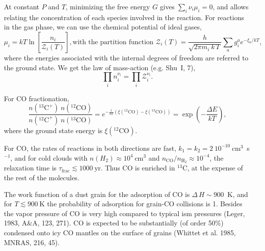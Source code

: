 At constant $P$ and $T$, minimizing the free energy $G$ gives $
\sum_i \nu_i \mu_i = 0$, and allows relating the concentration of each
species involved in the reaction. For reactions in the gas phase, we
can use the chemical potential of ideal gases,
\[ \mu_i = k T \ln \left[ \frac{n_i} {\mathcal{Z}_i(T)} \right], 
\text{with the partition function } \mathcal{Z}_i(T) = \frac{h}{\sqrt{2 \pi m_i
~k\,T}} \sum_a g^a_i e^{-\xi_a/kT}, \] where the energies associated
with the internal degrees of freedom are referred to the ground
state. We get the law of mass-action (e.g. Shu~I, 7), \[
\prod_i n_i^{\nu_i} = \prod_i \mathcal{Z}_i^{\nu_i}   .\]


\foilhead{} 

For CO fractionation,
\[  \frac{n(^{13}\mathrm{C}^{+}) ~n(^{12}\mathrm{CO})}{ n(^{12}\mathrm{C}^{+})
  ~n(^{13}\mathrm{CO})} = e^ {- \frac{1}{kT} \left(
  \xi(^{12}\mathrm{CO}) - \xi(^{13}\mathrm{CO} ) \right)} = \exp\left(
  -\frac{\Delta E}{kT} \right) , \] where the ground state energy is  $\xi(^{12}\mathrm{CO})$.

For CO, the rates of reactions in both directions are fast, $k_1 = k_2
= 2~10^{-10}~$cm$^3$~s$^{-1}$, and for cold clouds with  $n(H_2)
\approx 10^{4}~$cm$^3$ and $n_\mathrm{CO}/n_\mathrm{H_2} \approx
10^{-4}$, the relaxation time is $\tau_\mathrm{frac} \lesssim
1000~$yr. Thus CO is enriched in $^{13}$C, at the expense of the rest
of the molecules.

The work function of a dust grain for the adsorption of CO is
$\Delta\,H\sim$900~K, and for $T \lesssim 900~$K the probability of
adsorption for grain-CO collisions is 1. Besides the vapor pressure of
CO is very high compared to typical {\sc ism} pressures (Leger, 1983,
A\&A, 123, 271). CO is expected to be substantially (of order 50\%)
condensed onto icy CO mantles on the surface of grains (Whittet et
al. 1985, MNRAS, 216, 45).



\foilhead{}

